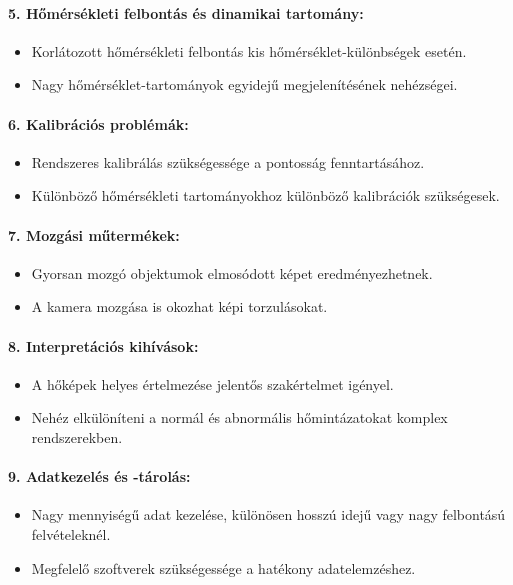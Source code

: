 \documentclass[a4paper,12pt]{article}
\begin{document}
\paragraph{5. Hőmérsékleti felbontás és dinamikai tartomány:} \begin{itemize} \item Korlátozott hőmérsékleti felbontás kis hőmérséklet-különbségek esetén. \item Nagy hőmérséklet-tartományok egyidejű megjelenítésének nehézségei. \end{itemize}

\paragraph{6. Kalibrációs problémák:} \begin{itemize} \item Rendszeres kalibrálás szükségessége a pontosság fenntartásához. \item Különböző hőmérsékleti tartományokhoz különböző kalibrációk szükségesek. \end{itemize}

\paragraph{7. Mozgási műtermékek:} \begin{itemize} \item Gyorsan mozgó objektumok elmosódott képet eredményezhetnek. \item A kamera mozgása is okozhat képi torzulásokat. \end{itemize}

\paragraph{8. Interpretációs kihívások:} \begin{itemize} \item A hőképek helyes értelmezése jelentős szakértelmet igényel. \item Nehéz elkülöníteni a normál és abnormális hőmintázatokat komplex rendszerekben. \end{itemize}

\paragraph{9. Adatkezelés és -tárolás:} \begin{itemize} \item Nagy mennyiségű adat kezelése, különösen hosszú idejű vagy nagy felbontású felvételeknél. \item Megfelelő szoftverek szükségessége a hatékony adatelemzéshez. \end{itemize}
\end{document}
